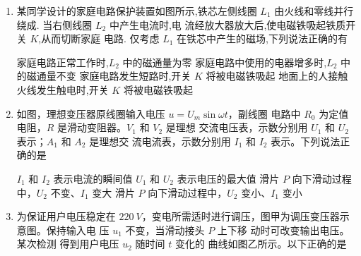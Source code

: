 \begin{enumerate}
\item 
{}
某同学设计的家庭电路保护装置如图所示,铁芯左侧线圈
$ L_{1} $ 由火线和零线并行绕成. 当右侧线圈 $ L_{2} $ 中产生电流时,电
流经放大器放大后,使电磁铁吸起铁质开关 $ K $,从而切断家庭
电路. 仅考虑 $ L_{1} $ 在铁芯中产生的磁场,下列说法正确的有  
\begin{figure}[h!]
\centering

\end{figure}

\fourchoices
{家庭电路正常工作时,$ L_{2} $ 中的磁通量为零}
{家庭电路中使用的电器增多时,$ L_{2} $ 中的磁通量不变}
{家庭电路发生短路时,开关 $ K $ 将被电磁铁吸起}
{地面上的人接触火线发生触电时,开关 $ K $ 将被电磁铁吸起}



\item 
{}
如图，理想变压器原线圈输入电压 $ u= U_{m} \sin \omega t $，副线圈
电路中 $ R_{0} $ 为定值电阻，$ R $ 是滑动变阻器。$ V_{1} $ 和 $ V_{2} $ 是理想
交流电压表，示数分别用 $ U_{1} $ 和 $ U_{2} $ 表示；$ A_{1} $ 和 $ A_{2} $ 是理想交
流电流表，示数分别用 $ I_{1} $ 和 $ I_{2} $ 表示。下列说法正确的是  
\begin{figure}[h!]
\centering

\end{figure}


\fourchoices
{$ I_{1} $ 和 $ I_{2} $ 表示电流的瞬间值}
{$ U_{1} $ 和 $ U_{2} $ 表示电压的最大值}
{滑片 $ P $ 向下滑动过程中，$ U_{2} $ 不变、$ I_{1} $ 变大}
{滑片 $ P $ 向下滑动过程中，$ U_{2} $ 变小、$ I_{1} $ 变小}


\item 
{}
为保证用户电压稳定在 $ 220 \ V $，变电所需适时进行调压，图甲为调压变压器示意图。保持输入电
压 $ u_{1} $ 不变，当滑动接头 $ P $ 上下移
动时可改变输出电压。某次检测
得到用户电压 $ u_{2} $ 随时间 $ t $ 变化的
曲线如图乙所示。以下正确的是  
\begin{figure}[h!]
\centering
\begin{subfigure}{0.4\linewidth}
\centering
 
\caption{}\label{}
\end{subfigure}
\begin{subfigure}{0.4\linewidth}
\centering
 
\caption{}\label{}
\end{subfigure}
\end{figure}




\end{enumerate}
